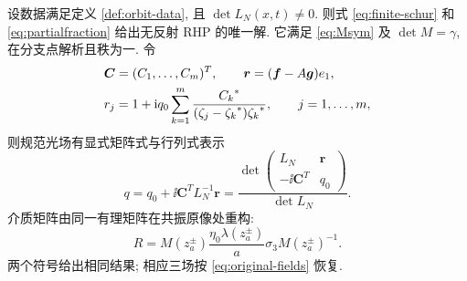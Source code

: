 \begin{theorem}\label{thm:N-orbit-RHP}
设数据满足定义 \ref{def:orbit-data}, 且 $\det L_N(x,t)\ne0$. 则式 \eqref{eq:finite-schur} 和 \eqref{eq:partialfraction} 给出无反射 RHP 的唯一解. 它满足 \eqref{eq:Msym} 及 $\det M=\gamma$, 在分支点解析且秩为一. 令
\begin{equation}\label{eq:N-rhs}
\begin{aligned}
&\boldsymbol C=(C_1,\ldots,C_m)^T,\qquad
\boldsymbol r=(\boldsymbol f-A\boldsymbol g)e_1,\\
&r_j=1+\mathrm{i} q_0\sum\limits_{k=1}^{m}
\dfrac{{C_k}^{*}}{(\zeta_j-{\zeta_k}^{*}){\zeta_k}^{*}},\qquad j=1,\ldots,m,
\end{aligned}
\end{equation}
则规范光场有显式矩阵式与行列式表示
\begin{equation}\label{eq:N-determinant-q}
q=q_0+\ii\boldsymbol C^T L_N^{-1}\boldsymbol r
=\dfrac{\det\begin{pmatrix}L_N&\boldsymbol r\\-\ii\boldsymbol C^T&q_0\end{pmatrix}}
{\det L_N}.
\end{equation}
介质矩阵由同一有理矩阵在共振原像处重构:
\begin{equation}\label{eq:N-medium}
R=M(z_a^\pm)\dfrac{\eta_0\lambda(z_a^\pm)}{a}\sigma_3 M(z_a^\pm)^{-1}.
\end{equation}
两个符号给出相同结果; 相应三场按 \eqref{eq:original-fields} 恢复.
\end{theorem}
